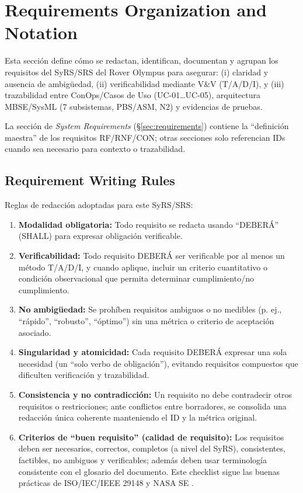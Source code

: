 
\section{Requirements Organization and Notation}

\begin{sloppypar}
Esta sección define cómo se redactan, identifican, documentan y agrupan los requisitos del SyRS/SRS del Rover Olympus para asegurar: (i) claridad y ausencia de ambigüedad, (ii) verificabilidad mediante V\&V (T/A/D/I), y (iii) trazabilidad entre ConOps/\allowbreak Casos de Uso (UC-01\ldots UC-05), arquitectura MBSE/\allowbreak SysML (7 subsistemas, PBS/\allowbreak ASM, N2) y evidencias de pruebas.
\end{sloppypar}  
La sección de \emph{System Requirements} (\S\ref{sec:requirements}) contiene la ``definición maestra'' de los requisitos RF/RNF/CON; otras secciones solo referencian IDs cuando sea necesario para contexto o trazabilidad.

\subsection{Requirement Writing Rules}

Reglas de redacción adoptadas para este SyRS/SRS:

\begin{enumerate}
    \item \textbf{Modalidad obligatoria:} Todo requisito se redacta usando ``DEBERÁ'' (SHALL) para expresar obligación verificable.
    \item \textbf{Verificabilidad:} Todo requisito DEBERÁ ser verificable por al menos un método T/A/D/I, y cuando aplique, incluir un criterio cuantitativo o condición observacional que permita determinar cumplimiento/no cumplimiento.
    \item \textbf{No ambigüedad:} Se prohíben requisitos ambiguos o no medibles (p. ej., ``rápido'', ``robusto'', ``óptimo'') sin una métrica o criterio de aceptación asociado.
    \item \textbf{Singularidad y atomicidad:} Cada requisito DEBERÁ expresar una sola necesidad (un ``solo verbo de obligación''), evitando requisitos compuestos que dificulten verificación y trazabilidad.
    \item \textbf{Consistencia y no contradicción:} Un requisito no debe contradecir otros requisitos o restricciones; ante conflictos entre borradores, se consolida una redacción única coherente manteniendo el ID y la métrica original.
    \item \textbf{Criterios de ``buen requisito'' (calidad de requisito):} Los requisitos deben ser necesarios, correctos, completos (a nivel del SyRS), consistentes, factibles, no ambiguos y verificables; además deben usar terminología consistente con el glosario del documento. Este checklist sigue las buenas prácticas de ISO/IEC/IEEE 29148 y NASA SE \cite{nasa_msfc_hdbk_3173}.
\end{enumerate}

